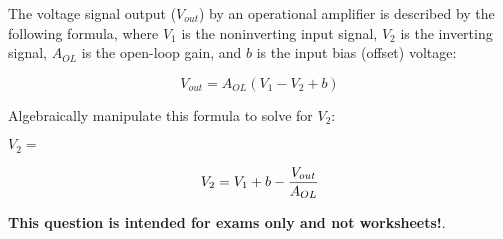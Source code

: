 

The voltage signal output ($V_{out}$) by an operational amplifier is described by the following formula, where $V_1$ is the noninverting input signal, $V_2$ is the inverting signal, $A_{OL}$ is the open-loop gain, and $b$ is the input bias (offset) voltage:

$$V_{out} = A_{OL} (V_1 - V_2 + b)$$

Algebraically manipulate this formula to solve for $V_2$:

\vskip 20pt

$V_2 = $







$$V_2 = V_1 + b - {V_{out} \over A_{OL}}$$







{\bf This question is intended for exams only and not worksheets!}.



